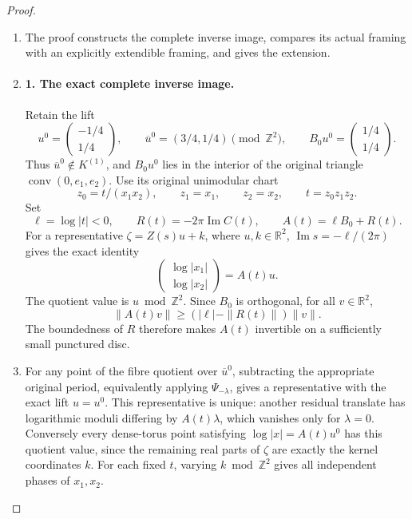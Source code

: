 \begin{proof}
\begin{enumerate}[label=\arabic*.,leftmargin=*]
\item The proof constructs the complete inverse image, compares its actual
framing with an explicitly extendible framing, and gives the extension.

\item \paragraph{1. The exact complete inverse image.}
Retain the lift
\[
 u^0=\begin{pmatrix}-1/4\\1/4\end{pmatrix},\qquad
 \overline u^0=(3/4,1/4)\pmod{\mathbb Z^2},\qquad
 B_0u^0=\begin{pmatrix}1/4\\1/4\end{pmatrix}.
\]
Thus \(\overline u^0\notin K^{(1)}\), and \(B_0u^0\) lies in the
interior of the original triangle \(\operatorname{conv}(0,e_1,e_2)\).
Use its original unimodular chart
\begin{equation}
 z_0=t/(x_1x_2),\qquad z_1=x_1,\qquad z_2=x_2,
 \qquad t=z_0z_1z_2.
 \label{wb:cusp-null:eq:chart}
\end{equation}
Set
\[
 \ell=\log|t|<0,\qquad R(t)=-2\pi\operatorname{Im}C(t),\qquad
 A(t)=\ell B_0+R(t).
\]
For a representative \(\zeta=Z(s)u+k\), where \(u,k\in\mathbb R^2\),
\(\operatorname{Im}s=-\ell/(2\pi)\) gives the exact identity
\begin{equation}
 \begin{pmatrix}\log|x_1|\\\log|x_2|\end{pmatrix}
 =A(t)u.
 \label{wb:cusp-null:eq:moduli}
\end{equation}
The quotient value is \(u\bmod\mathbb Z^2\).
Since \(B_0\) is orthogonal, for all \(v\in\mathbb R^2\),
\begin{equation}
 \|A(t)v\|\geq (|\ell|-\|R(t)\|)\|v\|.
 \label{wb:cusp-null:eq:invertibility}
\end{equation}
The boundedness of \(R\) therefore makes \(A(t)\) invertible on a
sufficiently small punctured disc.

\item For any point of the fibre quotient over \(\overline u^0\), subtracting
the appropriate original period, equivalently applying
\(\Psi_{-\lambda}\), gives a representative with the exact lift
\(u=u^0\). This representative is unique: another residual translate
has logarithmic moduli differing by \(A(t)\lambda\), which vanishes
only for \(\lambda=0\). Conversely every dense-torus point satisfying
\(\log|x|=A(t)u^0\) has this quotient value, since the remaining real
parts of \(\zeta\) are exactly the kernel coordinates \(k\).
For each fixed \(t\), varying \(k\bmod\mathbb Z^2\) gives all independent
phases of \(x_1,x_2\).


\end{enumerate}
\end{proof}
